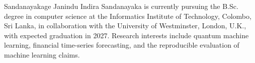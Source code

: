 \documentclass{ieeeaccess}
\begin{document}
\begin{IEEEbiographynophoto}{Sandanayakage Janindu Indira Sandanayaka}
is currently pursuing the B.Sc. degree in computer science at the Informatics Institute of Technology, Colombo, Sri Lanka, in collaboration with the University of Westminster, London, U.K., with expected graduation in 2027. Research interests include quantum machine learning, financial time-series forecasting, and the reproducible evaluation of machine learning claims.
\end{IEEEbiographynophoto}

\EOD
\end{document}
